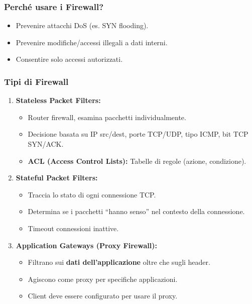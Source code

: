 \subsubsection{Perché usare i Firewall?}
\begin{itemize}
    \item Prevenire attacchi DoS (es. SYN flooding).
    \item Prevenire modifiche/accessi illegali a dati interni.
    \item Consentire solo accessi autorizzati.
\end{itemize}

\subsubsection{Tipi di Firewall}
\begin{enumerate}
    \item \textbf{Stateless Packet Filters:}
    \begin{itemize}
        \item Router firewall, esamina pacchetti individualmente.
        \item Decisione basata su IP src/dest, porte TCP/UDP, tipo ICMP, bit TCP SYN/ACK.
        \item \textbf{ACL (Access Control Lists):} Tabelle di regole (azione, condizione).
    \end{itemize}
    \item \textbf{Stateful Packet Filters:}
    \begin{itemize}
        \item Traccia lo stato di ogni connessione TCP.
        \item Determina se i pacchetti \textquotedblleft hanno senso\textquotedblright{} nel contesto della connessione.
        \item Timeout connessioni inattive.
    \end{itemize}
    \item \textbf{Application Gateways (Proxy Firewall):}
    \begin{itemize}
        \item Filtrano sui \textbf{dati dell'applicazione} oltre che sugli header.
        \item Agiscono come proxy per specifiche applicazioni.
        \item Client deve essere configurato per usare il proxy.
    \end{itemize}
\end{enumerate}
